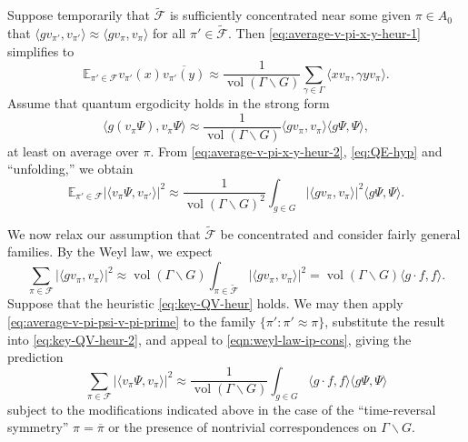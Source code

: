 \documentclass[reqno,10pt]{amsart}
\theoremstyle{plain} %
\theoremstyle{definition}
\theoremstyle{plain} %
\theoremstyle{remark}
\theoremstyle{itplain} %
\theoremstyle{remark} %
\numberwithin{equation}{section}
\DeclareMathOperator{\vol}{vol}
\begin{document}
Suppose temporarily that $\tilde{\mathcal{F}}$ is sufficiently concentrated near some given $\pi \in A_0$ that $\langle g v_{\pi '}, v_{\pi '} \rangle \approx \langle g v_{\pi}, v_\pi \rangle$ for all $\pi ' \in \tilde{\mathcal{F}}$.  Then \eqref{eq:average-v-pi-x-y-heur-1} simplifies to
\begin{equation}\label{eq:average-v-pi-x-y-heur-2}
  \mathbb{E}_{\pi' \in \mathcal{F}}
  v_{\pi'}(x) \overline{v_{\pi'}(y)}
  \approx 
  \frac{1}{\vol(\Gamma \backslash G)}
  \sum_{\gamma \in \Gamma}
  \langle x v_\pi, \gamma y v_\pi \rangle.
\end{equation}
Assume that quantum ergodicity holds in the strong form
\begin{equation}\label{eq:QE-hyp}
  \langle g (v_\pi \Psi), v_\pi \Psi  \rangle
  \approx
  \frac{1}{\vol(\Gamma \backslash G)}
  \langle g v_\pi, v_\pi  \rangle
  \langle g \Psi, \Psi  \rangle,
\end{equation}
at least on average over $\pi$.  From \eqref{eq:average-v-pi-x-y-heur-2}, \eqref{eq:QE-hyp} and ``unfolding,'' we obtain
\begin{equation}\label{eq:average-v-pi-psi-v-pi-prime}
  \mathbb{E}_{\pi' \in \mathcal{F}}
  \left\lvert \langle v_\pi \Psi, v_{\pi '} \rangle
  \right\rvert^2
  \approx
  \frac{1}{\vol(\Gamma \backslash G)^2}
  \int_{g \in G}
  |\langle g v_\pi, v_\pi  \rangle|^2
  \langle g \Psi, \Psi  \rangle.
\end{equation}

We now relax our assumption that $\tilde{\mathcal{F}}$ be concentrated and consider fairly general families.  By the Weyl law, we expect
\begin{equation}\label{eqn:weyl-law-ip-cons}
  \sum_{\pi \in \mathcal{F}}
  |\langle g v_\pi, v_\pi  \rangle|^2
  \approx
  \vol(\Gamma \backslash G)
  \int_{\pi \in \tilde{\mathcal{F}}}
  |\langle g v_\pi, v_\pi  \rangle|^2
  =
  \vol(\Gamma \backslash G)
  \langle g \cdot f, f \rangle.
\end{equation}
Suppose that the heuristic \eqref{eq:key-QV-heur} holds.  We may then apply \eqref{eq:average-v-pi-psi-v-pi-prime} to the family $\{\pi ' : \pi ' \approx \pi \}$, substitute the result into \eqref{eq:key-QV-heur-2}, and appeal to \eqref{eqn:weyl-law-ip-cons}, giving the prediction
\begin{equation}\label{eqn:general-QV-prediction}
  \sum_{\pi \in \mathcal{F}}
  \left\lvert \langle v_\pi \Psi, v_{\pi} \rangle
  \right\rvert^2
  \approx
  \frac{1}{\vol(\Gamma \backslash G)}
  \int_{g \in G}
  \langle g \cdot f, f \rangle
  \langle g \Psi, \Psi  \rangle
\end{equation}
subject to the modifications indicated above in the case of the ``time-reversal symmetry'' $\pi = \overline{\pi}$ or the presence of nontrivial correspondences on $\Gamma \backslash G$.
\end{document}
